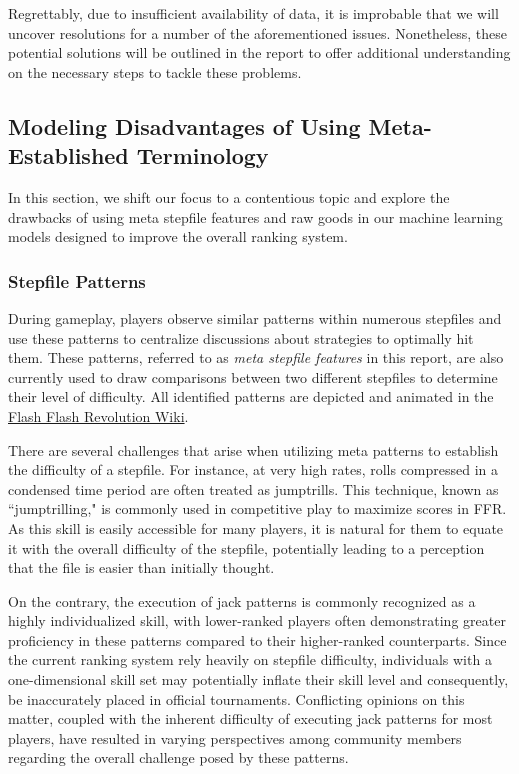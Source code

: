 Regrettably, due to insufficient availability of data, it is improbable that we will uncover resolutions for a number of the aforementioned issues. Nonetheless, these potential solutions will be outlined in the report to offer additional understanding on the necessary steps to tackle these problems.
\subsection{Modeling Disadvantages of Using Meta-Established Terminology}

In this section, we shift our focus to a contentious topic and explore the drawbacks of using meta stepfile features and raw goods in our machine learning models designed to improve the overall ranking system.

\subsubsection{Stepfile Patterns}

During gameplay, players observe similar patterns within numerous stepfiles and use these patterns to centralize discussions about strategies to optimally hit them. These patterns, referred to as \textit{meta stepfile features} in this report, are also currently used to draw comparisons between two different stepfiles to determine their level of difficulty. All identified patterns are depicted and animated in the \href{https://ffr.fandom.com/wiki/Category:Patterns}{Flash Flash Revolution Wiki}.

\vspace{2mm}

There are several challenges that arise when utilizing meta patterns to establish the difficulty of a stepfile. For instance, at very high rates, rolls compressed in a condensed time period are often treated as jumptrills. This technique, known as ``jumptrilling," is commonly used in competitive play to maximize scores in FFR. As this skill is easily accessible for many players, it is natural for them to equate it with the overall difficulty of the stepfile, potentially leading to a perception that the file is easier than initially thought.

\vspace{2mm}

On the contrary, the execution of jack patterns is commonly recognized as a highly individualized skill, with lower-ranked players often demonstrating greater proficiency in these patterns compared to their higher-ranked counterparts. Since the current ranking system rely heavily on stepfile difficulty, individuals with a one-dimensional skill set may potentially inflate their skill level and consequently, be inaccurately placed in official tournaments. Conflicting opinions on this matter, coupled with the inherent difficulty of executing jack patterns for most players, have resulted in varying perspectives among community members regarding the overall challenge posed by these patterns.

